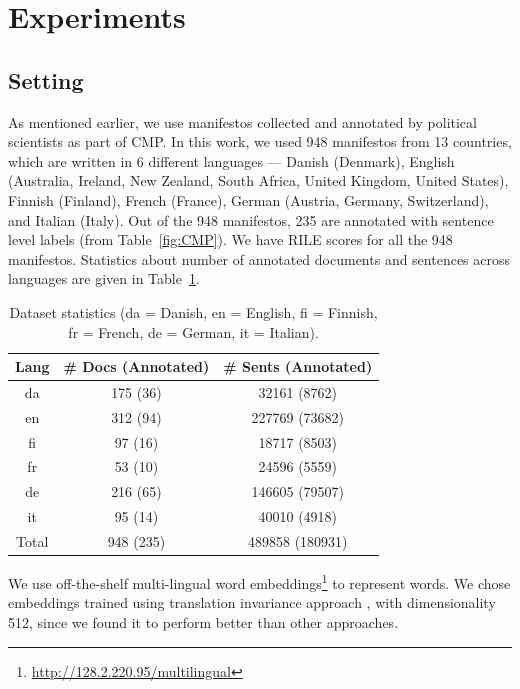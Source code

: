 \documentclass[11pt,a4paper]{article}
\newcommand{\tabref}[2][]{Table#1~\ref{#2}\xspace}
\begin{document}
\section{Experiments}
\subsection{Setting}
As mentioned earlier, we use manifestos collected and annotated by political scientists as part of CMP. In this work, we used 948 manifestos from 13 countries, which are written in 6 different languages --- Danish (Denmark), English (Australia, Ireland, New Zealand, South Africa, United Kingdom, United States), Finnish (Finland), French (France), German (Austria, Germany, Switzerland), and Italian (Italy). Out of the 948 manifestos, 235 are annotated with sentence level labels (from \tabref{fig:CMP}). We have RILE scores for all the 948 manifestos. Statistics about number of annotated documents and sentences across languages are given in \tabref{tab:al}.


 \begin{table}[!t]
  \centering
\begin{adjustbox}{max width=\columnwidth}
  \begin{tabular}{ c c c }
  \toprule
    Lang & \# Docs (Annotated) & \# Sents (Annotated)\\
    \midrule
    da  & 175 (36)  &  32161 (8762)	\\
    en   &  312 (94)& 227769 (73682) 	 \\    	
    fi  &  97 (16) &  18717 (8503) \\
    fr    & 53 (10) & 24596 (5559)\\
    de    & 216 (65) & 146605 (79507) \\
    it    & 95 (14)  & 40010 (4918)\\
\midrule
 Total    & 948 (235)  & 489858 (180931)\\
    \bottomrule

  \end{tabular}
  \end{adjustbox}
  \caption{Dataset statistics (da = Danish, en = English, fi = Finnish, fr = French, de = German, it = Italian).}
  \label{tab:al}
\end{table}

We use off-the-shelf multi-lingual word embeddings\footnote{\url{http://128.2.220.95/multilingual}} to represent words. We chose embeddings trained using translation invariance approach \cite{ammar2016massively}, with dimensionality 512, since we found it to perform better than other approaches. 
\end{document}
